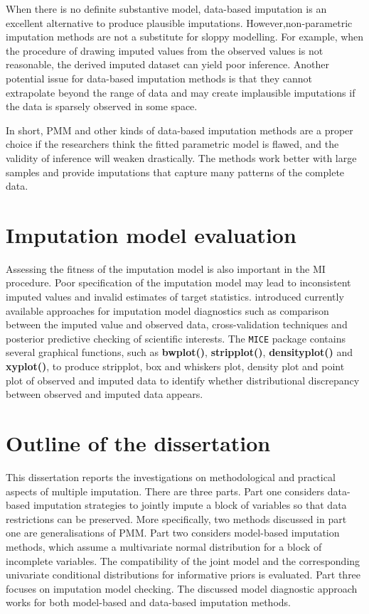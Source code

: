 When there is no definite substantive model, data-based imputation is an excellent alternative to produce plausible imputations. However,non-parametric imputation methods are not a substitute for sloppy modelling. For example, when the procedure of drawing imputed values from the observed values is not reasonable, the derived imputed dataset can yield poor inference. Another potential issue for data-based imputation methods is that they cannot extrapolate beyond the range of data and may create implausible imputations if the data is sparsely observed in some space. 

In short, PMM and other kinds of data-based imputation methods are a proper choice if the researchers think the fitted parametric model is flawed, and the validity of inference will weaken drastically. The methods work better with large samples and provide imputations that capture many patterns of the complete data. 

\section{Imputation model evaluation}
Assessing the fitness of the imputation model is also important in the MI procedure. Poor specification of the imputation model may lead to inconsistent imputed values and invalid estimates of target statistics. \citet{nguyen2017model} introduced currently available approaches for imputation model diagnostics such as comparison between the imputed value and observed data, cross-validation techniques and posterior predictive checking of scientific interests. The \texttt{MICE} package contains several graphical functions, such as \textbf{bwplot()}, \textbf{stripplot()}, \textbf{densityplot()} and \textbf{xyplot()}, to produce stripplot, box and whiskers plot, density plot and point plot of observed and imputed data to identify whether distributional discrepancy between observed and imputed data appears. 

\section{Outline of the dissertation}
This dissertation reports the investigations on methodological and practical aspects of multiple imputation. There are three parts. Part one considers data-based imputation strategies to jointly impute a block of variables so that data restrictions can be preserved. More specifically, two methods discussed in part one are generalisations of PMM. Part two considers model-based imputation methods, which assume a multivariate normal distribution for a block of incomplete variables. The compatibility of the joint model and the corresponding univariate conditional distributions for informative priors is evaluated. Part three focuses on imputation model checking. The discussed model diagnostic approach works for both model-based and data-based imputation methods.  
